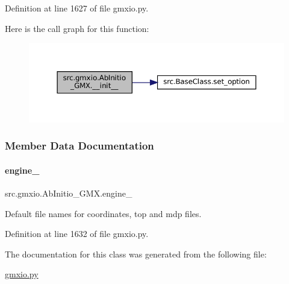 Definition at line 1627 of file gmxio.\+py.

Here is the call graph for this function\+:
\nopagebreak
\begin{figure}[H]
\begin{center}
\leavevmode
\includegraphics[width=350pt]{classsrc_1_1gmxio_1_1AbInitio__GMX_ac2e952e1bcc52afc4c07aa7c7a7c7692_cgraph}
\end{center}
\end{figure}


\subsubsection{Member Data Documentation}
\mbox{\label{classsrc_1_1gmxio_1_1AbInitio__GMX_a6773f593d20829cb39682e122ccaf934}} 
\paragraph{\texorpdfstring{engine\+\_\+}{engine\_}}
{\footnotesize\ttfamily src.\+gmxio.\+Ab\+Initio\+\_\+\+G\+M\+X.\+engine\+\_\+}



Default file names for coordinates, top and mdp files. 



Definition at line 1632 of file gmxio.\+py.



The documentation for this class was generated from the following file\+:\begin{DoxyCompactItemize}
\item 
\hyperlink{gmxio_8py}{gmxio.\+py}\end{DoxyCompactItemize}
